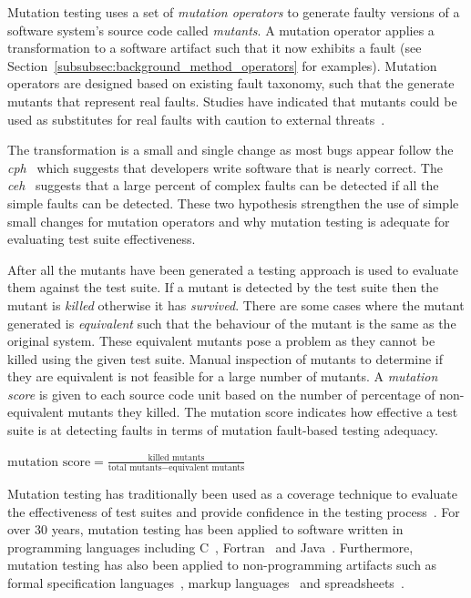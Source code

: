 Mutation testing uses a set of \emph{mutation operators} to generate faulty versions of a software system's source code called \emph{mutants}. A mutation operator applies a transformation to a software artifact such that it now exhibits a fault (see Section~\ref{subsubsec:background_method_operators} for examples). Mutation operators are designed based on existing fault taxonomy, such that the generate mutants that represent real faults. Studies have indicated that mutants could be used as substitutes for real faults with caution to external threats~\cite{ABLN06, NK11}.

The transformation is a small and single change as most bugs appear follow the \emph{\gls{cph}}~\cite{ABD+79} which suggests that developers write software that is nearly correct. The \emph{\gls{ceh}}~\cite{Off92} suggests that a large percent of complex faults can be detected if all the simple faults can be detected. These two hypothesis strengthen the use of simple small changes for mutation operators and why mutation testing is adequate for evaluating test suite effectiveness.

After all the mutants have been generated a testing approach is used to evaluate them against the test suite. If a mutant is detected by the test suite then the mutant is \emph{killed} otherwise it has \emph{survived}. There are some cases where the mutant generated is \emph{equivalent} such that the behaviour of the mutant is the same as the original system. These equivalent mutants pose a problem as they cannot be killed using the given test suite. Manual inspection of mutants to determine if they are equivalent is not feasible for a large number of mutants. A \emph{mutation score} is given to each source code unit based on the number of percentage of non-equivalent mutants they killed. The mutation score indicates how effective a test suite is at detecting faults in terms of mutation fault-based testing adequacy.


\begin{Large}
\begin{center}
\emph{$\text{mutation score} = \frac{\text{killed mutants}}{\text{total mutants} - \text{equivalent mutants}}$}
\end{center}
\end{Large}

Mutation testing has traditionally been used as a coverage technique to evaluate the effectiveness of test suites and provide confidence in the testing process~\cite{JH10}. For over 30 years, mutation testing has been applied to software written in programming languages including C~\cite{DM96, JH08}, Fortran~\cite{KO91} and Java~\cite{MKO02, BCD06}. Furthermore, mutation testing has also been applied to non-programming artifacts such as formal specification languages~\cite{ABM98}, markup languages~\cite{PO10} and spreadsheets~\cite{AE09}.

